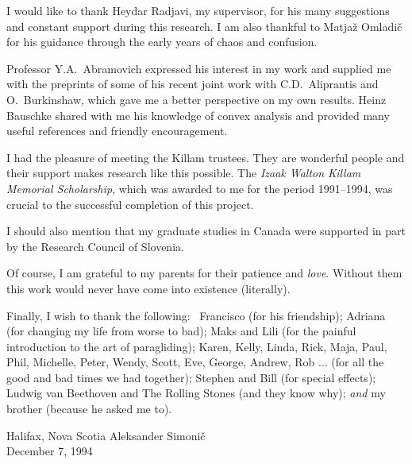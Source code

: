 
\def\baselinestretch{1.0}


I would like to thank Heydar Radjavi, my supervisor, for his
many suggestions and constant support during this research. I
am also thankful to Matja\v{z} Omladi\v{c} for his guidance
through the early years of chaos and confusion.

Professor Y.A.~Abramovich expressed his interest in my work and
supplied me with the preprints of some of his recent joint work
with C.D.~Aliprantis and O.~Burkinshaw, which gave me a better
perspective on my own results. Heinz Bauschke shared with me
his knowledge of convex analysis and provided many useful
references and friendly encouragement.

I had the pleasure of meeting the Killam trustees. They are
wonderful people and their support makes research like this
possible. The {\em Izaak Walton Killam Memorial Scholarship},
which was awarded to me for the period 1991--1994, was crucial
to the successful completion of this project.

I should also mention that my graduate studies in Canada were
supported in part by the Research Council of Slovenia.

Of course, I am grateful to my parents for their patience and
{\em love}. Without them this work would never have come into
existence (literally).

\medskip

Finally, I wish to thank the following: \, Francisco (for his
friendship); Adriana (for changing my life from worse to bad);
Maks and Lili (for the painful introduction to the art of
paragliding); Karen, Kelly, Linda, Rick, Maja, Paul, Phil,
Michelle, Peter, Wendy, Scott, Eve, George, Andrew, Rob ...
(for all the good and bad times we had together); Stephen and
Bill (for special effects); Ludwig van Beethoven and The
Rolling Stones (and they know why); {\em and } my brother
(because he asked me to).

\bigskip\medskip

\noindent
Halifax, Nova Scotia \hfill Aleksander Simoni\v{c}\\
December 7, 1994

